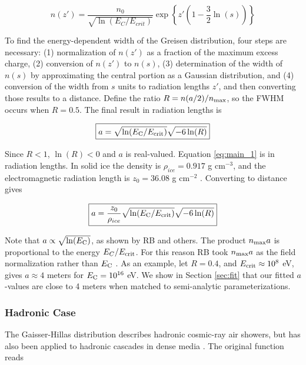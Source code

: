 \documentclass[amsmath,amssymb,aps,prd,10pt,twocolumn]{revtex4}
\begin{document}
\begin{equation}
n(z') = \frac{n_0}{\sqrt{\ln(E_C/E_{crit})}} \exp \left \lbrace z'\left(1 - \frac{3}{2}\ln(s) \right) \right \rbrace
\end{equation}

To find the energy-dependent width of the Greisen distribution, four steps are necessary: (1) normalization of $n(z')$ as a fraction of the maximum excess charge, (2) conversion of $n(z')$ to $n(s)$, (3) determination of the width of $n(s)$ by approximating the central portion as a Gaussian distribution, and (4) conversion of the width from $s$ units to radiation lengths $z'$, and then converting those results to a distance.  Define the ratio $R = n(a/2)/n_{\rm max}$, so the FWHM occurs when $R = 0.5$.  The final result in radiation lengths is

\begin{equation}
\boxed{
a = \sqrt{\ln(E_{\rm C}/E_{\rm crit})} \sqrt{-6\ln(R)}
} \label{eq:main_1}
\end{equation}

Since $R<1$, $\ln(R)<0$ and $a$ is real-valued.  Equation \ref{eq:main_1} is in radiation lengths.  In solid ice the density is $\rho_{ice} = 0.917$ g cm$^{-3}$, and the electromagnetic radiation length is $z_0 = 36.08$ g cm$^{-2}$ \cite{10.1016/j.astropartphys.2017.03.008}.  Converting to distance gives 

\begin{equation}
\boxed{
a = \frac{z_0}{\rho_{ice}}\sqrt{\ln(E_{\rm C}/E_{\rm crit})} \sqrt{-6\ln(R)}
}
\end{equation}

Note that $a \propto \sqrt{\ln(E_{\rm C})}$, as shown by RB and others.  The product $n_{\rm max} a$ is proportional to the energy $E_C/E_{\rm crit}$.  For this reason RB took $n_{\rm max} a$ as the field normalization rather than $E_{\rm C}$ \cite{10.1103/physrevd.65.016003}.  As an example, let $R = 0.4$, and $E_{\rm crit} \approx 10^8$ eV, gives $a \approx 4$ meters for $E_{\rm C} = 10^{16}$ eV.  We show in Section \ref{sec:fit} that our fitted $a$-values are close to 4 meters when matched to semi-analytic parameterizations.

\subsubsection{Hadronic Case}

The Gaisser-Hillas distribution describes hadronic cosmic-ray air showers, but has also been applied to hadronic cascades in dense media \cite{testbed}.  The original function reads
\end{document}
